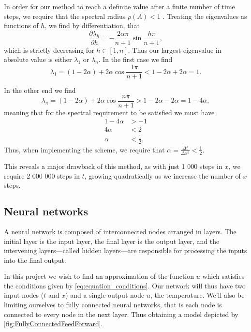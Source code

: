 \documentclass{article}
\theoremstyle{definition}
\begin{document}
In order for our method to reach a definite value after a finite number of time steps, we require that the spectral radius $\rho(A) < 1$ \parencite[p.~511]{matrixcomp}. Treating the eigenvalues as functions of $h$, we find by differentiation, that
\begin{equation*}
    \frac{\partial \lambda_h}{\partial h} = -\frac{2\alpha\pi}{n+1}\sin\frac{h\pi}{n+1},
\end{equation*}
which is strictly decreasing for $h \in [1, n]$. Thus our largest eigenvalue in absolute value is either $\lambda_1$ or $\lambda_n$. In the first case we find
\begin{equation*}
    \lambda_1 = (1 - 2\alpha) + 2\alpha \cos\frac{1\pi}{n + 1} < 1 - 2 \alpha + 2\alpha = 1.
\end{equation*}

In the other end we find
\begin{equation*}
    \lambda_n = (1 - 2\alpha) + 2\alpha \cos\frac{n\pi}{n + 1} > 1 - 2\alpha - 2\alpha = 1 - 4\alpha,
\end{equation*}
meaning that for the spectral requirement to be satisfied we must have
\begin{align*}
    1 - 4\alpha &> -1 \\
    4 \alpha &< 2 \\
    \alpha &< \frac{1}{2}.
\end{align*}
Thus, when implementing the scheme, we require that $\alpha=\frac{\Delta t}{\Delta x^2} < \frac{1}{2}$.

This reveals a major drawback of this method, as with just 1 000 steps in $x$, we require 2 000 000 steps in $t$, growing quadratically as we increase the number of $x$ steps.

\subsection{Neural networks}
A neural network is composed of interconnected nodes arranged in layers. The initial layer is the input layer, the final layer is the output layer, and the intervening layers—called hidden layers—are responsible for processing the inputs into the final output. 


In this project we wish to find an approximation of the function $u$ which satisfies the conditions given by \eqref{eq:equation_conditions}. Our network will thus have two input nodes ($t$ and $x$) and a single output node $u$, the temperature. We'll also be limiting ourselves to fully connected neural networks, that is each node is connected to every node in the next layer. Thus obtaining a model depicted by \autoref{fig:FullyConnectedFeedForward}.
\end{document}
